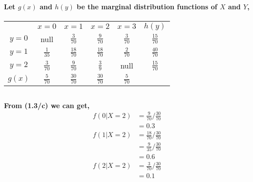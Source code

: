 \documentclass{article}
\begin{document}
        \subsection{}
            \paragraph{
                Let $g(x)$ and $h(y)$ be the marginal distribution functions of $X$ and $Y$, 
            }
            \begin{center}
                \begin{tabular}{ c c c c c c}
                      & $x=0$ &  $x=1$    & $x=2$       & $x=3$      &$h(y)$\\ 
                $y=0$ & null& $\frac{3}{70}$& $\frac{9}{70}$&$\frac{3}{70}$& $\frac{15}{70}$\\  
                $y=1$ &  $\frac{1}{35}$&$\frac{18}{70}$  &$\frac{18}{70}$&$\frac{2}{70}$ & $\frac{40}{70}$ \\
                $y=2$ &$\frac{3}{70}$&$\frac{9}{70}$&$\frac{3}{9}$&null&$\frac{15}{70}$ \\
                $g(x)$&$\frac{5}{70}$&$\frac{30}{70}$&$\frac{30}{70}$&$\frac{5}{70}$
                \end{tabular}
            \end{center}
        \subsection{}
            \paragraph{
                From (1.3/c) we can get,
                \begin{equation*}
                    \begin{split}
                        f(0|X=2)&=\frac{9}{70}/\frac{30}{70}\\
                            &=0.3\\
                        f(1|X=2)&=\frac{18}{70}/\frac{30}{70}\\
                            &=\frac{9}{35}/\frac{30}{70}\\
                            &=0.6\\
                        f(2|X=2)&=\frac{3}{70}/\frac{30}{70}\\
                            &=0.1\\
                    \end{split}
                \end{equation*}
            }
\end{document}

